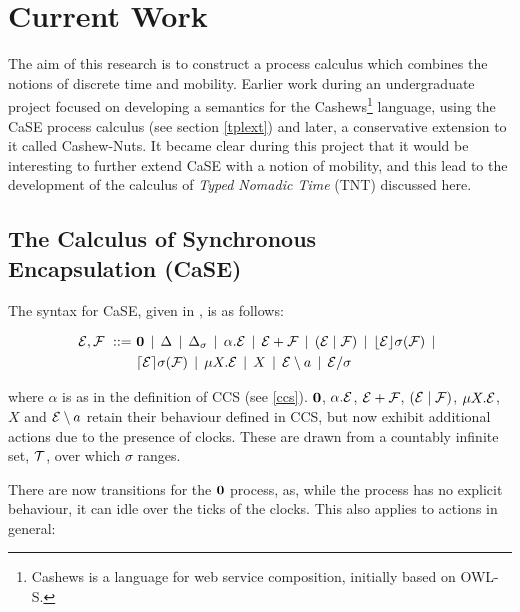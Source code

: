 \chapter{Current Work}
\label{currentwork}

The aim of this research is to construct a process calculus which
combines the notions of discrete time and mobility.  Earlier work
during an undergraduate project focused on developing a semantics for
the Cashews\footnote{Cashews is a language for web service
  composition, initially based on OWL-S.}\cite{cashews-sem} language,
using the CaSE process calculus (see section \ref{tplext}) and later,
a conservative extension to it called Cashew-Nuts.  It became clear
during this project that it would be interesting to further extend CaSE
with a notion of mobility, and this lead to the development of the
calculus of \emph{Typed Nomadic Time} (TNT) discussed here.

\section{The Calculus of Synchronous \\ Encapsulation (CaSE)}
\label{case}

The syntax for CaSE, given in \cite{norton05alg}, is as follows:

\begin{equation}
  \begin{aligned}
    \text{$\mathcal{E}$}, \text{$\mathcal{F}$}\ ::=\ &
    \textbf{0}  \;\,|\,\; 
    \Delta \;\,|\,\; 
    \Delta_{\sigma} \;\,|\,\; 
    \alpha . \text{$\mathcal{E}$}  \;\,|\,\;
    \text{$\mathcal{E}$} + \text{$\mathcal{F}$} \;\,|\,\; 
    (\text{$\mathcal{E}$}\;|\;\text{$\mathcal{F}$})\;\,|\,\; 
    \lfloor{\text{$\mathcal{E}$}}\rfloor {\sigma} ({\text{$\mathcal{F}$}}) \;\,|\,\; \\
    & \lceil{\text{$\mathcal{E}$}}\rceil {\sigma} ({\text{$\mathcal{F}$}}) \;\,|\,\; 
    \mu X . \text{$\mathcal{E}$} \;\,|\,\; 
    X \;\,|\,\; 
    \text{$\mathcal{E}$} \setminus a \;\,|\,\; 
    \text{$\mathcal{E}$} / \sigma
  \end{aligned}
\end{equation}

\noindent where $\alpha$ is as in the definition of CCS (see \ref{ccs}).
$\textbf{0}$, $\alpha.\text{$\mathcal{E}$}$, $\text{$\mathcal{E}$} + \text{$\mathcal{F}$}$, $(\text{$\mathcal{E}$}\;|\;\text{$\mathcal{F}$})$, $\mu X
. \text{$\mathcal{E}$}$, $X$ and $\text{$\mathcal{E}$} \setminus a$ retain their behaviour defined in
CCS, but now exhibit additional actions due to the presence of clocks.
These are drawn from a countably infinite set, $\text{$\mathcal{T}$}$, over which
$\sigma$ ranges.

There are now transitions for the $\textbf{0}$ process, as, while the
process has no explicit behaviour, it can idle over the ticks of the
clocks.  This also applies to actions in general:

